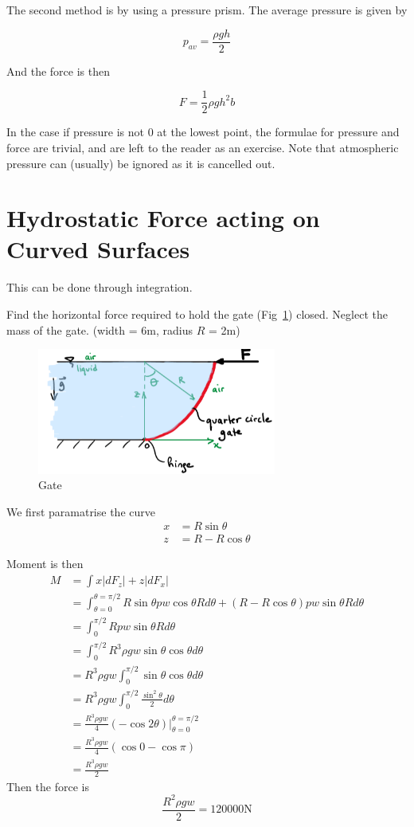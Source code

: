 \documentclass[12pt]{article}
\begin{document}
The second method is by using a pressure prism. The average pressure is given by

$$p_{av} = \frac{\rho gh}{2}$$

And the force is then

$$F = \frac{1}{2}\rho gh^2b$$

In the case if pressure is not 0 at the lowest point, the formulae for pressure and force are trivial, and are left to the reader as an exercise. Note that atmospheric pressure can (usually) be ignored as it is cancelled out.

\section{Hydrostatic Force acting on Curved Surfaces}

This can be done through integration.
\begin{ex}
	Find the horizontal force required to hold the gate (Fig~\ref{gate2}) closed. Neglect the mass of the gate. (width = 6m, radius $R$ = 2m)

	\begin{figure}
		\centering
		\includegraphics[width=0.7\textwidth]{gate2.png}
		\caption{Gate}
		\label{gate2}
	\end{figure}

	We first paramatrise the curve
	\begin{align*}
		x &= R\sin\theta \\
		z &= R - R\cos\theta
	\end{align*}

	Moment is then
	\begin{align*}
		M &= \int x |dF_z| + z |dF_x| \\
		  &= \int_{\theta = 0}^{\theta = \pi/2} R \sin{\theta} p w \cos{\theta} R d\theta + (R - R\cos{\theta})pw\sin{\theta}R d\theta \\
		  &= \int_0^{\pi/2} Rpw\sin{\theta} R d\theta \\
		  &= \int_0^{\pi/2} R^3 \rho g w \sin{\theta} \cos{\theta} d\theta \\
		  &= R^3 \rho g w \int_0^{\pi/2} \sin{\theta} \cos{\theta} d\theta \\
		  &= R^3 \rho g w \int_0^{\pi/2} \frac{\sin^2{\theta}}{2} d\theta \\
		  &= \frac{R^3 \rho g w}{4} (-\cos{2\theta}) \Big |_{\theta=0}^{\theta=\pi/2} \\
		  &= \frac{R^3 \rho g w}{4} (\cos{0} - \cos{\pi}) \\
		  &= \frac{R^3 \rho g w}{2}
	\end{align*}
	Then the force is
	$$\frac{R^2\rho gw}{2} = 120000\text{N}$$
\end{ex}
\end{document}
